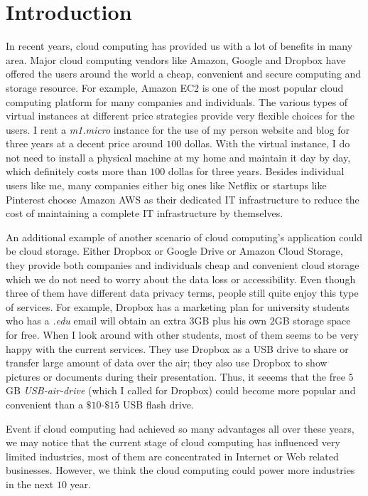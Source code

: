 \section{Introduction}
In recent years, cloud computing has provided us with a lot of benefits in many area. Major cloud computing vendors like Amazon, Google and Dropbox have offered the users around the world a cheap, convenient and secure computing and storage resource. For example, Amazon EC2 is one of the most popular cloud computing platform for many companies and individuals. The various types of virtual instances at different price strategies provide very flexible choices for the users. I rent a \emph{m1.micro} instance for the use of my person website and blog for three years at a decent price around $100$ dollas. With the virtual instance, I do not need to install a physical machine at my home and maintain it day by day, which definitely costs more than $100$ dollas for three years. Besides individual users like me, many companies either big ones like Netflix or startups like Pinterest choose Amazon AWS as their dedicated IT infrastructure to reduce the cost of maintaining a complete IT infrastructure by themselves. 

An additional example of another scenario of cloud computing's application could be cloud storage. Either Dropbox or Google Drive or Amazon Cloud Storage, they provide both companies and individuals cheap and convenient cloud storage which we do not need to worry about the data loss or accessibility. Even though three of them have different data privacy terms, people still quite enjoy this type of services. For example, Dropbox has a marketing plan for university students who has a \emph{.edu} email will obtain an extra $3$GB plus his own $2$GB storage space for free. When I look around with other students, most of them seems to be very happy with the current services. They use Dropbox as a USB drive to share or transfer large amount of data over the air; they also use Dropbox to show pictures or documents during their presentation. Thus, it seeems that the free $5$GB \emph{USB-air-drive} (which I called for Dropbox) could become more popular and convenient than a $\$10$-$\$15$ USB flash drive.

Event if cloud computing had achieved so many advantages all over these years, we may notice that the current stage of cloud computing has influenced very limited industries, most of them are concentrated in Internet or Web related businesses. However, we think the cloud computing could power more industries in the next $10$ year.   

